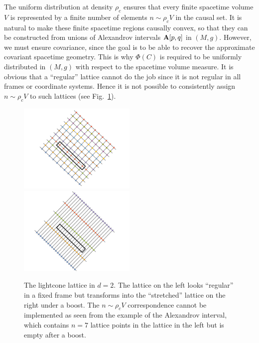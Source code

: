 The uniform distribution at density $\rho_c$ ensures that  every finite spacetime volume $V$ is represented
by  a finite number of elements $n \sim \rho_c V $ in the causal set.  It is natural to make these finite spacetime regions
causally convex, so that they can be constructed from unions of Alexandrov intervals $\mathbf A[p,q] $ in $(M,g)$. 
 However,  we must
ensure covariance, since the goal is to be able to recover the approximate covariant spacetime geometry.  This is why 
$\Phi(C)$ is required to be uniformly distributed in $(M,g)$ with respect to the spacetime volume measure. It is obvious
that a ``regular'' lattice cannot do the job since it is  not  regular in all frames or coordinate systems. Hence  it is not
possible to consistently  assign $n \sim \rho_c V$ to such lattices (see Fig.~{\ref{lattice.fig}}). 
\begin{figure}
\centerline{
  \includegraphics[width=0.5\textwidth]{Diamond-I}
  \includegraphics[width=0.5\textwidth]{Diamond-II}
}
\caption{The lightcone lattice in $d=2$. The lattice on the left looks ``regular'' in a fixed frame but 
  transforms into the ``stretched''  lattice on the right under a boost. The $n \sim \rho_cV$ correspondence cannot be
  implemented as seen from  the example of the Alexandrov interval, which  contains $n=7$ lattice points in the lattice
  in the left but is empty after a boost.}
\label{lattice.fig}
  \end{figure}
 


